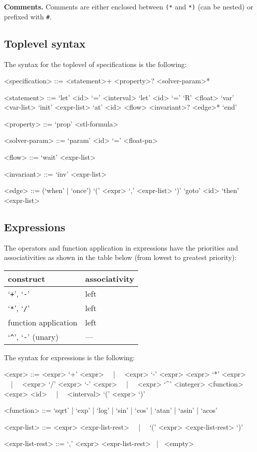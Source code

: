 \documentclass[10pt,a4paper]{article}
\begin{document}
\noindent
\textbf{Comments.}
Comments are either enclosed between \texttt{(*} and \texttt{*)} (can be nested) or prefixed with \texttt{\#}.


\subsection{Toplevel syntax}

The syntax for the toplevel of specifications is the following:
\begin{grammar}
<specification> ::= <statement>+ <property>? <solver-param>*

<statement> ::= 
`let' <id> `=' <interval>
\alt `let' <id> `=' `R' <float>
\alt `var' <var-list>
\alt `init' <expr-list>
\alt `at' <id> <flow> <invariant>? <edge>* `end'

<property> ::= `prop' <stl-formula>

<solver-param> ::= `param' <id> `=' <float-pn>


<flow> ::= `wait' <expr-list>

<invariant> ::= `inv' <expr-list>

<edge> ::= (`when' | `once') `(' <expr> `,' <expr-list> `)' `goto' <id> `then' <expr-list>
\end{grammar}


\subsection{Expressions}

The operators and function application in expressions have the priorities and associativities as shown in the table below (from lowest to greatest priority):
\begin{table}[ht]
	\centering
    \begin{tabular}{|l|l|} \hline
		construct & associativity \\
		\hline
		`\texttt{+}', `\texttt{-}' & left \\
		`\texttt{*}', `\texttt{/}' & left \\
		function application & left \\
		`\texttt{\^}', `\texttt{-}' (unary) & --- \\
		\hline
	\end{tabular}
\end{table}

The syntax for expressions is the following:
\begin{grammar}
<expr> ::= <expr> `+' <expr> ~~|~~ <expr> `-' <expr>
\alt <expr> `*' <expr> ~~|~~ <expr> `/' <expr>
\alt `-' <expr> ~~|~~ <expr> `^' <integer>
\alt <function> <expr>
\alt <id> ~~|~~ <interval>
\alt `(' <expr> `)' 

<function> ::= `sqrt' | `exp' | `log' | `sin' | `cos' | `atan' | `asin' | `acos'

<expr-list> ::= <expr> <expr-list-rest> ~~|~~ `(' <expr> <expr-list-rest> `)'

<expr-list-rest> ::= `,' <expr> <expr-list-rest> ~|~ <empty>
\end{grammar}
\end{document}
